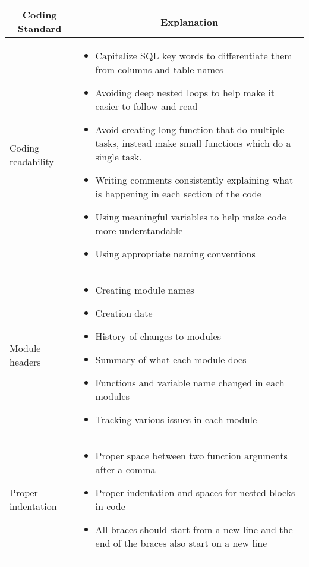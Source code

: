 \documentclass[12pt]{article}
\begin{document}
	\begin{longtable}{|p{6cm}|p{10cm}|}
		\hline
		\multicolumn{1}{|c|}{\textbf{Coding Standard}} & \multicolumn{1}{c|}{\textbf{Explanation}} 
		\\ \hline
		Coding readability
		&  
		\begin{itemize}
			\item Capitalize SQL key words to differentiate them from columns and table names
			\item Avoiding deep nested loops to help make it easier to follow and read
			\item Avoid creating long function that do multiple tasks, instead make small functions which do a single task.
			\item Writing comments consistently explaining what is happening in each section of the code
			\item Using meaningful variables to help make code more understandable
			\item Using appropriate naming conventions
		\end{itemize}                                 
		\\ \hline
		Module headers
		&  
		\begin{itemize}
			\item Creating module names
			\item Creation date
			\item History of changes to modules
			\item Summary of what each module does
			\item Functions and variable name changed in each modules
			\item Tracking various issues in each module
		\end{itemize} 
								
		\\ \hline
		Proper indentation
		&
		\begin{itemize}
			\item Proper space between two function arguments after a comma
			\item Proper indentation and spaces for nested blocks in code
			\item All braces should start from a new line and the end of the braces also start on a new line
		\end{itemize}
									
		\\ \hline
	\end{longtable}
\end{document}
